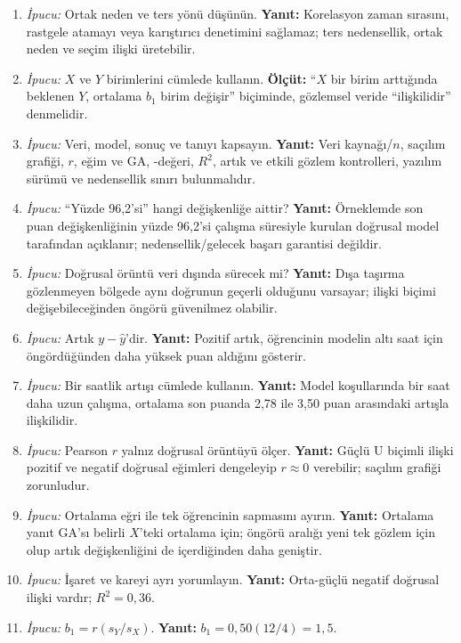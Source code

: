 \begin{enumerate}[leftmargin=*,itemsep=5pt]
\item \emph{İpucu:} Ortak neden ve ters yönü düşünün.
\textbf{Yanıt:} Korelasyon zaman sırasını, rastgele atamayı veya karıştırıcı
denetimini sağlamaz; ters nedensellik, ortak neden ve seçim ilişki üretebilir.
\item \emph{İpucu:} $X$ ve $Y$ birimlerini cümlede kullanın.
\textbf{Ölçüt:} ``$X$ bir birim arttığında beklenen $Y$, ortalama $b_1$ birim
değişir'' biçiminde, gözlemsel veride ``ilişkilidir'' denmelidir.
\item \emph{İpucu:} Veri, model, sonuç ve tanıyı kapsayın.
\textbf{Yanıt:} Veri kaynağı/$n$, saçılım grafiği, $r$, eğim ve GA, \pval-değeri,
$R^2$, artık ve etkili gözlem kontrolleri, yazılım sürümü ve nedensellik sınırı bulunmalıdır.
\item \emph{İpucu:} ``Yüzde 96,2'si'' hangi değişkenliğe aittir?
\textbf{Yanıt:} Örneklemde son puan değişkenliğinin yüzde 96,2'si çalışma
süresiyle kurulan doğrusal model tarafından açıklanır; nedensellik/gelecek başarı garantisi değildir.
\item \emph{İpucu:} Doğrusal örüntü veri dışında sürecek mi?
\textbf{Yanıt:} Dışa taşırma gözlenmeyen bölgede aynı doğrunun geçerli olduğunu
varsayar; ilişki biçimi değişebileceğinden öngörü güvenilmez olabilir.
\item \emph{İpucu:} Artık $y-\hat y$'dir.
\textbf{Yanıt:} Pozitif artık, öğrencinin modelin altı saat için öngördüğünden
daha yüksek puan aldığını gösterir.
\item \emph{İpucu:} Bir saatlik artışı cümlede kullanın.
\textbf{Yanıt:} Model koşullarında bir saat daha uzun çalışma, ortalama son
puanda 2,78 ile 3,50 puan arasındaki artışla ilişkilidir.
\item \emph{İpucu:} Pearson $r$ yalnız doğrusal örüntüyü ölçer.
\textbf{Yanıt:} Güçlü U biçimli ilişki pozitif ve negatif doğrusal eğimleri
dengeleyip $r\approx0$ verebilir; saçılım grafiği zorunludur.
\item \emph{İpucu:} Ortalama eğri ile tek öğrencinin sapmasını ayırın.
\textbf{Yanıt:} Ortalama yanıt GA'sı belirli $X$'teki ortalama için; öngörü
aralığı yeni tek gözlem için olup artık değişkenliğini de içerdiğinden daha geniştir.
\item \emph{İpucu:} İşaret ve kareyi ayrı yorumlayın.
\textbf{Yanıt:} Orta-güçlü negatif doğrusal ilişki vardır; $R^2=0{,}36$.
\item \emph{İpucu:} $b_1=r(s_Y/s_X)$.
\textbf{Yanıt:} $b_1=0{,}50(12/4)=1{,}5$.

\end{enumerate}
